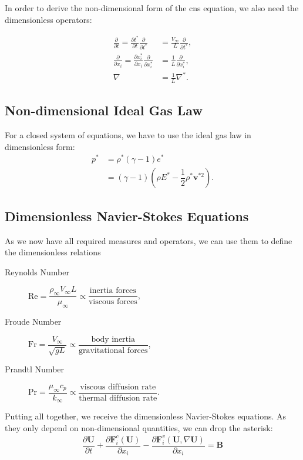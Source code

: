 	In order to derive the non-dimensional form of the \gls{cns} equation, we also need the dimensionless operators:
	
	\begin{align}
		\frac{\partial}{\partial t}= \frac{\partial t^*}{\partial t} \frac{\partial}{\partial t^*} &= \frac{V_\infty}{L} \frac{\partial}{\partial t^*}, \\
		\frac{\partial}{\partial x_i} = \frac{\partial x_i^*}{\partial x_i} \frac{\partial}{\partial x_i^*} &= \frac{1}{L} \frac{\partial}{\partial x_i^*}, \\
		\nabla &= \frac{1}{L} \nabla^*.
	\end{align}
	
		
	\subsection{Non-dimensional Ideal Gas Law}
	For a closed system of equations, we have to use the ideal gas law in dimensionless form: 
	\begin{align}
		p^* &= \rho^* (\gamma - 1) e^* \\
		&= (\gamma - 1) \left(\rho E^* - \dfrac{1}{2} \rho^* \mathbf{v}^{*2}\right) .
	\end{align}	
	
	\subsection{Dimensionless Navier-Stokes Equations}
	As we now have all required measures and operators, we can use them to define the dimensionless relations 
	\begin{description}
		\item[Reynolds Number] $\text{Re} = \dfrac{\rho_\infty V_\infty L}{\mu_\infty} \propto \dfrac{\text{inertia forces}}{\text{viscous forces}}$,
		\item[Froude Number] \quad $\text{Fr} = \dfrac{V_\infty }{\sqrt{g L}} \propto \dfrac{\text{body inertia}}{\text{gravitational forces}}$,
		\item[Prandtl Number]\quad $\text{Pr} = \dfrac{ \mu_\infty c_p}{k_\infty} \propto \dfrac{\text{viscous diffusion rate}}{\text{thermal diffusion rate}}$.
	\end{description}
	Putting all together, we receive the dimensionless Navier-Stokes equations. As they only depend on non-dimensional quantities, we can drop the asterisk:
	\begin{align}
		\dfrac{\partial \mathbf{U}}{\partial t} + \dfrac{\partial \mathbf{F}_i^c(\mathbf{U})}{\partial x_i} - \dfrac{\partial \mathbf{F}_i^v(\mathbf{U}, \nabla\mathbf{U})}{\partial x_i} = \mathbf{B}
	\end{align}
	
